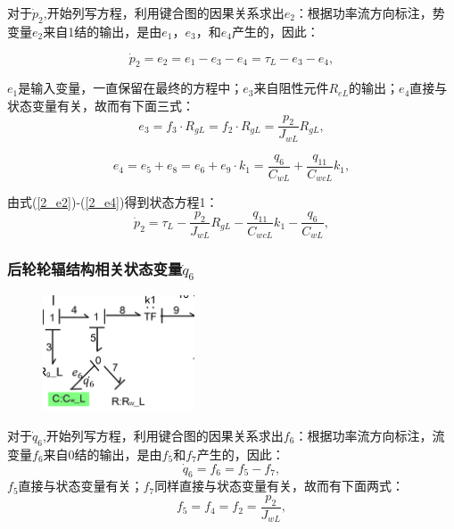 对于$\dot{p} _ { 2 }$,开始列写方程，利用键合图的因果关系求出$e_2$：根据功率流方向标注，势变量$e_2$来自1结的输出，是由$e_1$，$e_3$，和$e_4$产生的，因此：

\begin{equation}\label{2_e2}
\dot{p}_{2}
=
e_2
=
e_1
-
e_3
-
e_4
=
\tau_L
-
e_3
-
e_4,
\end{equation}

$e_1$是输入变量，一直保留在最终的方程中；$e_3$来自阻性元件$R _ { eL }$的输出；$e_4$直接与状态变量有关，故而有下面三式：
\begin{equation}\label{2_e3}
e_3
=
f_3 \cdot R_{gL}
=
f_2 \cdot R_{gL}
=
\frac{p_{2}}{J_{wL}} R_{g L},
\end{equation}

\begin{equation}\label{2_e4}
e_4 = e_5 + e_8
=
e_6 + e_9 \cdot k_1
= 
\frac{q_{6}}{C_{wL}}
+
\frac{q_{11}}{C_{wcL}} k_{1},
\end{equation}

由式(\ref{2_e2})-(\ref{2_e4})得到状态方程1：
\begin{equation}\label{2_p2}
\dot{p}_{2}
=
\tau_{L}
-
\frac{p_{2}}{J_{wL}} R_{g L}
-
\frac{q_{11}}{C_{wcL}} k_{1}
-
\frac{q_{6}}{C_{wL}},
\end{equation}

\subsubsection{后轮轮辐结构相关状态变量$\dot{q}_6 $}
\begin{figure}[H]
	\centering
	\includegraphics[width=0.4\textwidth]{fig/2_equation2.png}
\end{figure}
对于$\dot{q}_{ 6 }$,开始列写方程，利用键合图的因果关系求出$f_6$：根据功率流方向标注，流变量$f_6$来自0结的输出，是由$f_5$和$f_7$产生的，因此：
\begin{equation}\label{2_f6}
\dot{q}_{6}
=
f_6
=
f_5 - f_7,
\end{equation}
$f_5$直接与状态变量有关；$f_7$同样直接与状态变量有关，故而有下面两式：
\begin{equation}\label{2_f5}
f_5
=
f_4
=
f_2
=
\frac{p_{2}}{J_{w L}},
\end{equation}

